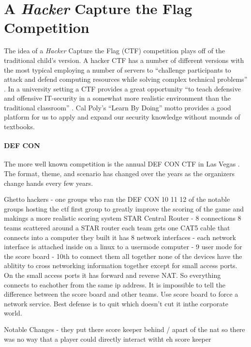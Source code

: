 \documentclass[10pt]{article}
\begin{document}
\section{A \textit{Hacker} Capture the Flag Competition}
The idea of a \textit{Hacker} Capture the Flag (CTF) competition plays off of
the traditional child's version. A hacker CTF has a number of different versions
with the most typical employing a number of servers to ``challenge participants
to attack and defend computing resources while solving complex technical
problems'' \cite{HackingCompetitionsForSecurityEducation}. In a university
setting a CTF provides a great opportunity ``to teach defensive and offensive
IT-security in a somewhat more realistic environment than the traditional
classroom'' \cite{HostingHackingChallenge}. Cal Poly's ``Learn By Doing'' motto
provides a good platform for us to apply and expand our security knowledge
without mounds of textbooks.

\paragraph*{DEF CON} The more well known competition is the annual DEF CON CTF
in Las Vegas \cite{DEFCONCTF}. The format, theme, and scenario has changed over
the years as the organizers change hands every few years.

Ghetto hackers - one groups who ran the DEF CON 10 11 12 of the notable groups hosting the ctf
first group to greatly improve the scoring of the game and makings a more
realistic scoring system
STAR Central Router - 8 connections
8 teams scattered around a STAR router
each team gets one CAT5 cable that connects into a computer they built
it has 8 network interfaces - each network interface is attached inside on a linux to a
usermode computer - 9 user mode for the score board - 10th to connect them all together
none of the devices have the ablitity to cross networking information together
except for small access ports. On the small access ports it  has forward and reverse NAT. So
everything connects to eachother from the same ip address. It is impossible to tell
the difference between the score board and other teams. Use score board to force a 
network service. Best defense is to quit which doesn't cut it inthe corporate world.


Notable Changes
- they put there score keeper behind / apart of the nat
so there was no way that a player could directly interact witht eh score keeper
\end{document}
